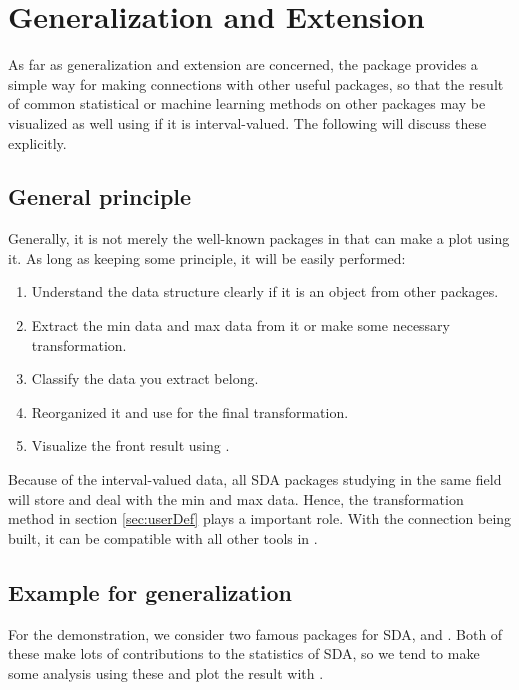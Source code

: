 \documentclass[article]{jss}
\begin{document}
\section{Generalization and Extension}

As far as generalization and extension are concerned, the package provides a simple way for making connections with other useful packages, so that the result of common statistical or machine learning methods on other packages may be visualized as well using  if it is interval-valued. The following will discuss these explicitly. 

\subsection{General principle}\label{sec:genPrin}

Generally, it is not merely the well-known packages in  that can make a plot using it. As long as keeping some principle, it will be easily performed:

\begin{enumerate}
  \item Understand the data structure clearly if it is an object from other packages.
  \item Extract the min data and max data from it or make some necessary transformation.
  \item Classify the data you extract belong.
  \item Reorganized it and use  for the final transformation.
  \item Visualize the front result using .
\end{enumerate}

Because of the interval-valued data, all SDA packages studying in the same field will store and deal with the min and max data. Hence, the transformation method in section \ref{sec:userDef} plays a important role.
With the connection being built, it can be compatible with all other tools in .


\subsection{Example for generalization}

For the demonstration, we consider two famous  packages for SDA,  \cite{irpino2015} and  \cite{Silva2011}. Both of these make lots of contributions to the statistics of SDA, so we tend to make some analysis using these and plot the result with .
\end{document}
